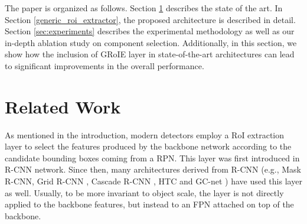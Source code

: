 \documentclass[10pt,conference,a4paper]{IEEEtran}
\begin{document}
The paper is organized as follows.
Section \ref{sec:related} describes the state of the art.
In Section \ref{generic_roi_extractor}, the proposed architecture is described in detail. Section \ref{sec:experiments} describes the experimental methodology as well as our in-depth ablation study on component selection. Additionally, in this section, we show how the inclusion of GRoIE layer in state-of-the-art architectures can lead to significant improvements in the overall performance.
 \section{Related Work}\label{sec:related}

As mentioned in the introduction, modern detectors employ a RoI extraction layer to select the features produced by the backbone network according to the candidate bounding boxes coming from a RPN.
This layer was first introduced in R-CNN network. Since then, many architectures derived from R-CNN (e.g., Mask R-CNN, Grid R-CNN \cite{lu2019grid}, Cascade R-CNN \cite{cai2019cascade}, HTC \cite{chen2019hybrid} and GC-net \cite{cao2019gcnet}) have used this layer as well. 
Usually, to be more invariant to object scale, the layer is not directly applied to the backbone features, but instead to an FPN attached on top of the backbone.
\end{document}

